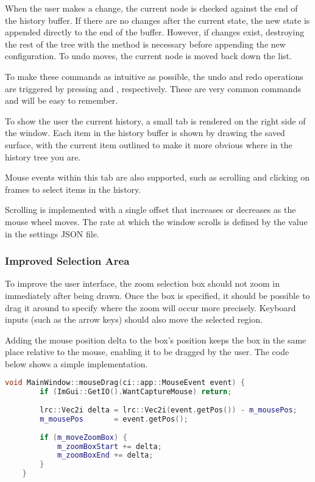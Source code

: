 When the user makes a change, the current node is checked against the end of the history buffer. If there are no changes after the current state, the new state is appended directly to the end of the buffer. However, if changes exist, destroying the rest of the tree with the  method is necessary before appending the new configuration. To undo moves, the current node is moved back down the list.

To make these commands as intuitive as possible, the undo and redo operations are triggered by pressing  and , respectively. These are very common commands and will be easy to remember.

To show the user the current history, a small tab is rendered on the right side of the window. Each item in the history buffer is shown by drawing the saved surface, with the current item outlined to make it more obvious where in the history tree you are.

Mouse events within this tab are also supported, such as scrolling and clicking on frames to select items in the history.

Scrolling is implemented with a single offset that increases or decreases as the mouse wheel moves. The rate at which the window scrolls is defined by the  value in the settings JSON file.

\subsubsection{Improved Selection Area}

To improve the user interface, the zoom selection box should not zoom in immediately after being drawn. Once the box is specified, it should be possible to drag it around to specify where the zoom will occur more precisely. Keyboard inputs (such as the arrow keys) should also move the selected region.

Adding the mouse position delta to the box's position keeps the box in the same place relative to the mouse, enabling it to be dragged by the user. The code below shows a simple implementation.

\begin{lstlisting}[language=c++]
	void MainWindow::mouseDrag(ci::app::MouseEvent event) {
		if (ImGui::GetIO().WantCaptureMouse) return;
		
		lrc::Vec2i delta = lrc::Vec2i(event.getPos()) - m_mousePos;
		m_mousePos		 = event.getPos();
		
		if (m_moveZoomBox) {
			m_zoomBoxStart += delta;
			m_zoomBoxEnd += delta;
		}
	}
\end{lstlisting}

